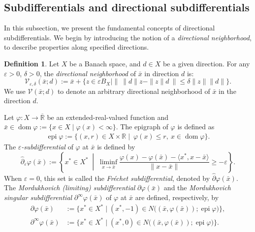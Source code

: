 \documentclass[12pt,twoside,reqno]{amsart}
\theoremstyle{definition}
\newtheorem{definition}[theorem]{Definition}
\numberwithin{equation}{section}
\begin{document}
\subsection{Subdifferentials and directional subdifferentials}

In this subsection, we present the fundamental concepts of directional subdifferentials. 
We begin by introducing the notion of a \emph{directional neighborhood}, to describe properties along specified directions.

\begin{definition}\label{defn:directional neighborhood}
Let \( X \) be a Banach space, and \( d \in X \) be a given direction.  
For any \( \varepsilon > 0 \), \( \delta > 0 \), the \emph{directional neighborhood} of \( \bar{x} \) in direction \( d \) is: 
\[
\mathcal{V}_{\varepsilon,\delta}(\bar{x}; d) := \bar x+\{z \in \varepsilon B_X \mid \|~ \|d\|z - \|z\|d ~\| \leq \delta \|z\| \|d\| \}. 
\]
We use $\mathcal{V}(\bar x;d)$ to denote an arbitrary directional neighborhood of $\bar x$ in the direction $d$. 
\end{definition}

Let $\varphi: X \to \overline{\mathbb{R}}$ be an extended-real-valued function and $\bar{x} \in \operatorname{dom} \varphi:=\{x\in X \mid \varphi(x)<\infty\}$. The epigraph of $\varphi$ is defined as
\begin{equation*}
    \begin{split}
        \operatorname{epi} \varphi:=\{(x,r)\in X\times \mathbb{R}\mid ~\varphi(x)\leq r, ~x\in \operatorname{dom} \varphi\}.
    \end{split}
\end{equation*}
The \emph{$\varepsilon$-subdifferential} of $\varphi$ at $\bar{x}$ is defined by
\[
\widehat{\partial}_{\varepsilon}\varphi(\bar{x})
:= \left\{ x^* \in X^* \;\middle|\; \liminf_{x \to \bar{x}} \frac{\varphi(x) - \varphi(\bar{x}) - \langle x^*, x - \bar{x} \rangle}{\|x - \bar{x}\|} \geq -\varepsilon \right\}.
\]
When $\varepsilon = 0$, this set is called the \emph{Fr\'echet subdifferential}, denoted by $\widehat{\partial}\varphi(\bar{x})$. 
The \emph{Mordukhovich (limiting) subdifferential} $\partial \varphi(\bar{x})$ and the \emph{Mordukhovich singular subdifferential} $\partial^{\infty}\varphi(\bar{x})$ of $\varphi$ at $\bar{x}$ are defined, respectively, by
\begin{align*}
    \partial \varphi(\bar{x}) &:= \big\{ x^* \in X^* \mid (x^*, -1) \in N\big((\bar{x}, \varphi(\bar{x})); \operatorname{epi} \varphi\big) \big\}, \\
    \partial^{\infty}\varphi(\bar{x}) &:= \big\{ x^* \in X^* \mid (x^*, 0) \in N\big((\bar{x}, \varphi(\bar{x})); \operatorname{epi} \varphi\big) \big\}.
\end{align*}
\end{document}
